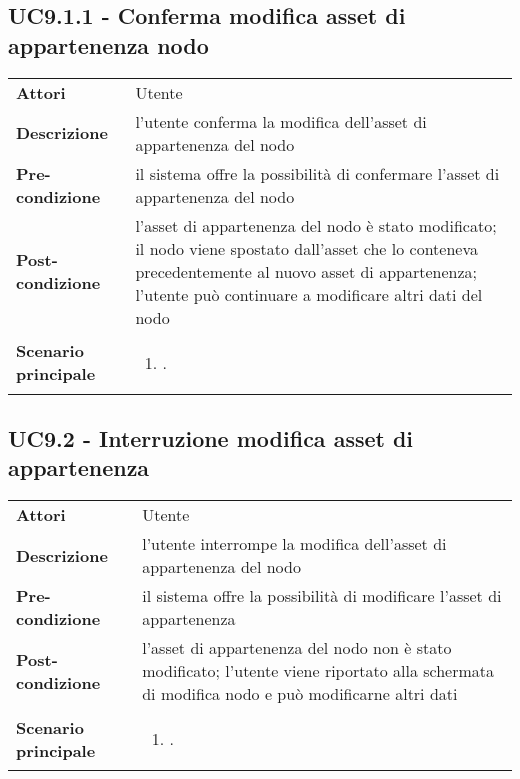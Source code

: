 \subsection{UC9.1.1 - Conferma modifica asset di appartenenza nodo} 
\label{sssec:UC9.1.1} 
\def\arraystretch{1.5}
\begin{tabularx}{\textwidth}{l|p{}}
	\rowcolor{I} \multicolumn{2}{c}{\color{white}\textbf{UC9.1.1 - Conferma modifica asset di appartenenza nodo}} \\
	\toprule
	\endhead
	\textbf{Attori} & Utente\\
	\textbf{Descrizione} & l'utente conferma la modifica dell'asset di appartenenza del nodo\\
	\textbf{Pre-condizione} & il sistema offre la possibilità di confermare l'asset di appartenenza del nodo\\
	\textbf{Post-condizione} & l'asset di appartenenza del nodo è stato modificato; il nodo viene spostato dall'asset che lo conteneva precedentemente al nuovo asset di appartenenza; l'utente può continuare a modificare altri dati del nodo\\
	\textbf{Scenario principale} & \vspace{-1.2em}\begin{enumerate}[leftmargin=*,noitemsep,nosep]
		\item \nameref{sssec:UC9.1.1}.
	\end{enumerate}\\
	\bottomrule
\end{tabularx}

\subsection{UC9.2 - Interruzione modifica asset di appartenenza} 
\label{sssec:UC9.2} 
\def\arraystretch{1.5}
\begin{tabularx}{\textwidth}{l|p{}}
	\rowcolor{I} \multicolumn{2}{c}{\color{white}\textbf{UC9.2 - Interruzione modifica asset di appartenenza}} \\
	\toprule
	\endhead
	\textbf{Attori} & Utente\\
	\textbf{Descrizione} & l'utente interrompe la modifica dell'asset di appartenenza del nodo\\
	\textbf{Pre-condizione} & il sistema offre la possibilità di modificare l'asset di appartenenza\\
	\textbf{Post-condizione} & l'asset di appartenenza del nodo non è stato modificato; l'utente viene riportato alla schermata di modifica nodo e può modificarne altri dati\\
	\textbf{Scenario principale} & \vspace{-1.2em}\begin{enumerate}[leftmargin=*,noitemsep,nosep]
		\item \nameref{sssec:UC9.2}.
	\end{enumerate}\\
	\bottomrule
\end{tabularx}
